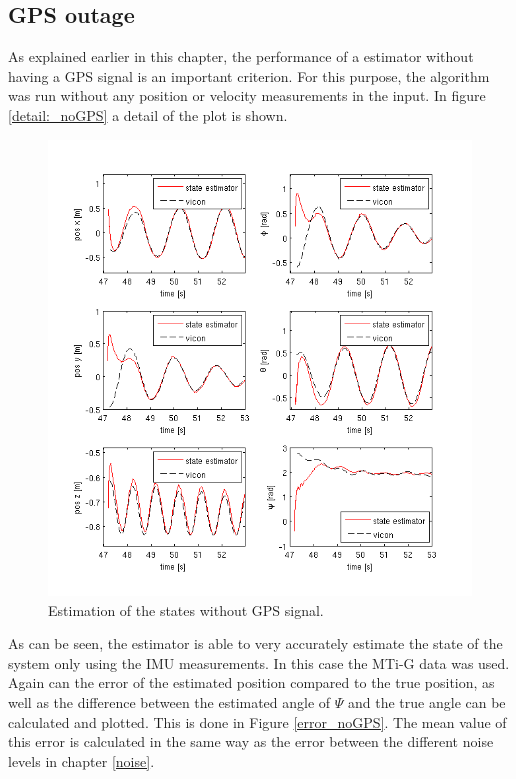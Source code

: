 \subsection{GPS outage}\label{no_GPS}
As explained earlier in this chapter, the performance of a estimator without having a GPS signal is an important criterion. For this purpose, the algorithm was run without any position or velocity measurements in the input. In figure \ref{detail:_noGPS} a detail of the plot is shown.
\begin{figure}[h]
\centering
\includegraphics[width=1\textwidth]{pictures/2_2_detail_noGPS.png}
\caption{Estimation of the states without GPS signal.}
\label{detail_noGPS}
\end{figure}
As can be seen, the estimator is able to very accurately estimate the state of the system only using the IMU measurements. In this case the MTi-G data was used. Again can the error of the estimated position compared to the true position, as well as the difference between the estimated angle of $\Psi$ and the true angle can be calculated and plotted. This is done in Figure \ref{error_noGPS}. The mean value of this error is calculated in the same way as the error between the different noise levels in chapter \ref{noise}.
